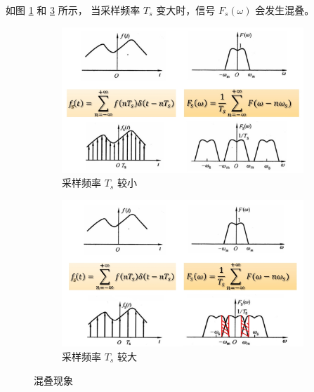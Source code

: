 \begin{example}
    如图 \ref{fig:aliasing-example-1} 和 \ref{fig:aliasing-example-2} 所示，
    当采样频率 $T_s$ 变大时，信号 $F_s(\omega)$ 会发生混叠。
    \begin{figure}[H]
        \centering
        \begin{subfigure}{0.45\textwidth}
            \centering
            \includegraphics[width=\textwidth]{chap2/img/aliasing-example-1.png}
            \caption{采样频率 $T_s$ 较小}
            \label{fig:aliasing-example-1}
        \end{subfigure}
        \hfill
        \begin{subfigure}{0.45\textwidth}
            \centering
            \includegraphics[width=\textwidth]{chap2/img/aliasing-example-2.png}
            \caption{采样频率 $T_s$ 较大}
            \label{fig:aliasing-example-2}
        \end{subfigure}
        \caption{混叠现象}
    \end{figure}
\end{example}

